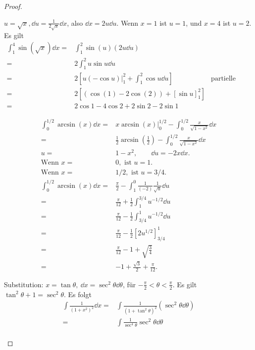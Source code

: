 \begin{proof}
	\begin{parts}
	\item $u=\sqrt{x},\dd{u}=\frac{1}{2\sqrt{x} }\dd{x}$, also $\dd{x}=2u\dd{u}$. Wenn $x=1$ ist $u=1$, und $x= 4$ ist $u=2$. Es gilt
		\begin{align*}
			\int_1^4\sin(\sqrt{x} )\dd{x}=&\int_1^2 \sin(u)(2u\dd{u})\\
			=&2\int_1^2 u\sin u\dd{u}\\
			=&2\left[ u(-\cos u)|_1^2 + \int_1^2 \cos u \dd{u} \right] & \text{partielle Integration}\\
			=& 2\left[ (\cos(1)-2\cos(2))+[\sin u]_1^2 \right] \\
			=&2\cos 1-4\cos 2 + 2\sin 2-2\sin 1
		\end{align*}
	\item 
		\begin{align*}
			\int_0^{1 / 2}\arcsin(x)\dd{x}=&x\arcsin(x)|_0^{1 / 2}-\int_0^{1 / 2}\frac{x}{\sqrt{1-x^2} }\dd{x}\\
			=&\frac{1}{2}\arcsin\left( \frac{1}{2} \right) -\int_0^{1 / 2}\frac{x}{\sqrt{1-x^2} }\dd{x}\\
			u =& 1-x^2,\qquad \dd{u}=-2x\dd{x}.\\
			\text{Wenn }x=&0,\text{ ist }u=1.\\
			\text{Wenn }x=&1 / 2,\text{ ist }u=3 / 4.\\
			\int_0^{1 / 2}\arcsin(x)\dd{x}=&\frac{\pi}{2}-\int_1^0 \frac{1}{(-2)} \frac{1}{\sqrt{u} }\dd{u}\\
			=&\frac{\pi}{12}+\frac{1}{2}\int_1^{3 / 4} u^{-1 / 2}\dd{u}\\
			=&\frac{\pi}{12}-\frac{1}{2}\int^1_{3 / 4} u^{-1 / 2}\dd{u}\\
			=&\frac{\pi}{12}-\frac{1}{2}\left[ 2u^{1 / 2} \right]_{3 / 4}^1\\
			=&\frac{\pi}{12}-1+\sqrt{\frac{3}{4}} \\
			=&-1+\frac{\sqrt{3} }{2}+\frac{\pi}{12}.
		\end{align*}
	\item Substitution: $x=\tan\theta,~\dd{x}=\sec^2\theta\dd{\theta}$, f\"{u}r $-\frac{\pi}{2}<\theta<\frac{\pi}{2}$. Es gilt $\tan^2\theta+1=\sec^2\theta$. Es folgt
		\begin{align*}
			\int \frac{1}{(1+x^2)^2}\dd{x}=& \int \frac{1}{(1+\tan^2\theta)^2}(\sec^2\theta\dd{\theta})\\
			=& \int \frac{1}{\sec^4\theta}\sec^2\theta\dd{\theta}\\

\end{align*}
\end{parts}
\end{proof}
